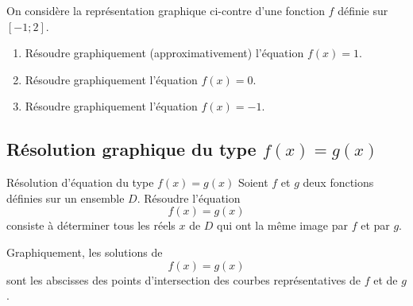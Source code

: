\documentclass[11pt]{article}
\begin{document}
\begin{app}
  \begin{minipage}{.6\textwidth}
    On considère la représentation graphique ci-contre d'une fonction $f$ définie sur
    $\left[ -1;2 \right]$.
    \begin{enumerate}
      \item Résoudre graphiquement (approximativement) l'équation $f(x)=1$.
      \item Résoudre graphiquement l'équation $f(x)=0$.
      \item Résoudre graphiquement l'équation $f(x)=-1$.
    \end{enumerate}
  \end{minipage}
  \begin{minipage}{.4\textwidth}
    \begin{center}
    \end{center}
  \end{minipage}
\end{app}

\subsection{Résolution graphique du type $f(x)=g(x)$}
\begin{defi}{Résolution d'équation du type $f(x)=g(x)$}
  Soient $f$ et $g$ deux fonctions définies sur un ensemble $D$. Résoudre
  l'équation
  \[
    f(x)=g(x)
  \]
  consiste à déterminer tous les réels $x$ de $D$ qui ont la même image par $f$
  et par $g$.
\end{defi}

\begin{prop}
  Graphiquement, les solutions de
  \[
    f(x)=g(x)
  \]
  sont les abscisses des points d'intersection des courbes représentatives de
  $f$ et de $g$.
\end{prop}
\end{document}
